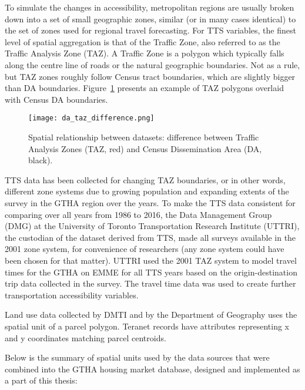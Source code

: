 To simulate the changes in accessibility, metropolitan regions are usually broken down into a set of small geographic zones, similar (or in many cases identical) to the set of zones used for regional travel forecasting.
For TTS variables, the finest level of spatial aggregation is that of the Traffic Zone, also referred to as the Traffic Analysis Zone (TAZ).
A Traffic Zone is a polygon which typically falls along the centre line of roads or the natural geographic boundaries\cite{DataManagementGroup2019}.
Not as a rule, but TAZ zones roughly follow Census tract boundaries, which are slightly bigger than DA boundaries.
Figure~\ref{fig:da_taz_difference} presents an example of TAZ polygons overlaid with Census DA boundaries.

\begin{figure}[hbt!]
    \centering
    \texttt{[image: da\_taz\_difference.png]}
    \caption{Spatial relationship between datasets: difference between Traffic Analysis Zones (TAZ, red) and Census Dissemination Area (DA, black).}
    \label{fig:da_taz_difference}
\end{figure}

TTS data has been collected for changing TAZ boundaries, or in other words, different zone systems due to growing population and expanding extents of the survey in the GTHA region over the years.
To make the TTS data consistent for comparing over all years from 1986 to 2016, the Data Management Group (DMG) at the University of Toronto Transportation Research Institute (UTTRI), the custodian of the dataset derived from TTS, made all surveys available in the 2001 zone system, for convenience of researchers (any zone system could have been chosen for that matter).
UTTRI used the 2001 TAZ system to model travel times for the GTHA on EMME for all TTS years based on the origin-destination trip data collected in the survey.
The travel time data was used to create further transportation accessibility variables.

Land use data collected by DMTI and by the Department of Geography uses the spatial unit of a parcel polygon.
Teranet records have attributes representing x and y coordinates matching parcel centroids.

\vspace{5mm}

Below is the summary of spatial units used by the data sources that were combined into the GTHA housing market database, designed and implemented as a part of this thesis:

